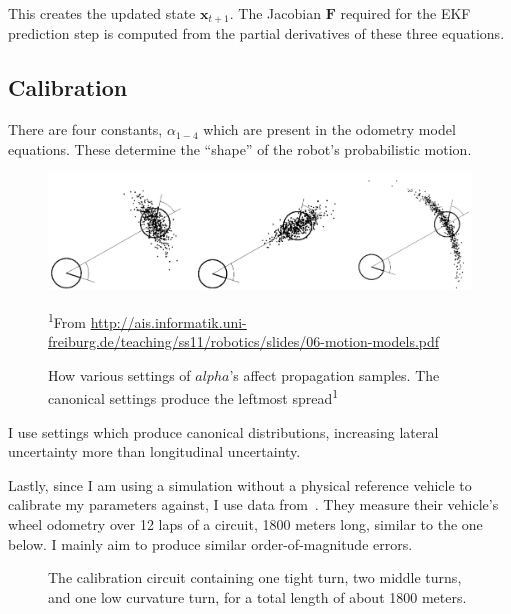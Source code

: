 \documentclass[a4paper,12pt,twoside,openright]{report}
\begin{document}
This creates the updated state $\bm{x}_{t+1}$. The Jacobian $\bm{F}$ required
for the EKF prediction step is computed from the partial derivatives
of these three equations.


\subsection{Calibration}

There are four constants, $\alpha_{1-4}$ which are present in the odometry
model equations. These determine the ``shape'' of the robot's probabilistic
motion.

\begin{figure}
    \includegraphics[width=\linewidth]{figures/implementation/ekf/noise_params.png}
\caption[Noise Parameter Settings]{How various settings of $alpha$'s affect propagation samples. The canonical settings produce the leftmost spread\textsuperscript{1}}
\tiny\textsuperscript{1}{From \url{http://ais.informatik.uni-freiburg.de/teaching/ss11/robotics/slides/06-motion-models.pdf}}
    \label{fig:ekf:noiseparams}
\end{figure}

I use settings which produce canonical distributions, increasing lateral uncertainty more
than longitudinal uncertainty.


Lastly, since I am using a simulation without a physical reference vehicle to
calibrate my parameters against, I use data from~\cite{vivacqua2017low}. 
They measure their vehicle's wheel odometry over 12 laps of a circuit, 1800 meters long, similar
to the one below. I mainly aim to produce similar order-of-magnitude errors.

\begin{figure}
    \begin{center}
        
    \end{center}
    \caption[Calibration Circuit]{The calibration circuit containing one tight turn, two middle turns, and one low curvature turn, for a total length of about 1800 meters.}
    \label{fig:ekf:noiseparams}
\end{figure}
\end{document}
